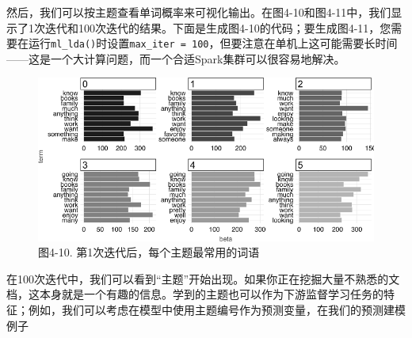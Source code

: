 \documentclass[
]{article}
\newenvironment{Shaded}{\begin{snugshade}}{\end{snugshade}}
\newcommand{\DataTypeTok}[1]{\textcolor[rgb]{0.13,0.29,0.53}{#1}}
\newcommand{\DecValTok}[1]{\textcolor[rgb]{0.00,0.00,0.81}{#1}}
\newcommand{\KeywordTok}[1]{\textcolor[rgb]{0.13,0.29,0.53}{\textbf{#1}}}
\newcommand{\NormalTok}[1]{#1}
\newcommand{\OperatorTok}[1]{\textcolor[rgb]{0.81,0.36,0.00}{\textbf{#1}}}
\newcommand{\OtherTok}[1]{\textcolor[rgb]{0.56,0.35,0.01}{#1}}
\newcommand{\StringTok}[1]{\textcolor[rgb]{0.31,0.60,0.02}{#1}}
\begin{document}
然后，我们可以按主题查看单词概率来可视化输出。在图4-10和图4-11中，我们显示了1次迭代和100次迭代的结果。下面是生成图4-10的代码；要生成图4-11，您需要在运行\texttt{ml\_lda()}时设置\texttt{max\_iter\ =\ 100}，但要注意在单机上这可能需要长时间------这是一个大计算问题，而一个合适Spark集群可以很容易地解决。

\begin{Shaded}
\end{Shaded}

\begin{figure}
\centering
\includegraphics{figures/4_10.png}
\caption{图4-10. 第1次迭代后，每个主题最常用的词语}
\end{figure}

在100次迭代中，我们可以看到``主题''开始出现。如果你正在挖掘大量不熟悉的文档，这本身就是一个有趣的信息。学到的主题也可以作为下游监督学习任务的特征；例如，我们可以考虑在模型中使用主题编号作为预测变量，在我们的预测建模例子
\end{document}
